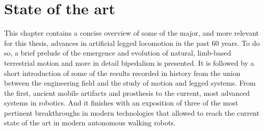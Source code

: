 \chapter{State of the art} %
\label{cha:state_of_the_art}
This chapter contains a concise overview of some of the major, and more relevant for this thesis, advances in artificial legged locomotion in the past 60 years.
To do so, a brief prelude of the emergence and evolution of natural, limb-based terrestrial motion and more in detail bipedalism is presented.
It is followed by a short introduction of some of the results recorded in history from the union between the engineering field and the study of motion and legged systems. 
From the first, ancient mobile artifacts and prosthesis to the current, most advanced systems in robotics.
And it finishes with an exposition of three of the most pertinent breakthroughs in modern technologies that allowed to reach the current state of the art in modern autonomous walking robots.




%
%




